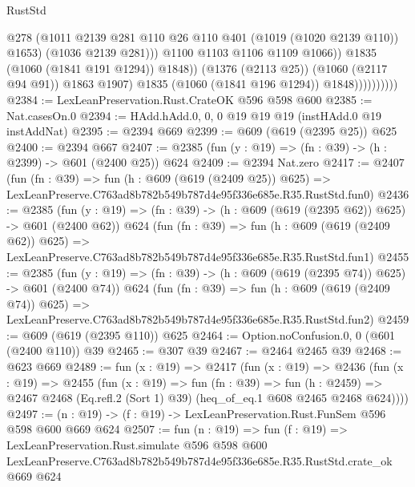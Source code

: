 \begin{lexlean}{RustStd}
\begin{coremodule}
                                      @278
                                      (@1011
                                        @2139
                                        @281
                                        @110
                                        @26
                                        @110
                                        @401
                                        (@1019 (@1020 @2139 @110))
                                        @1653)
                                      (@1036 @2139 @281)))
                                  @1100
                                  @1103
                                  @1106
                                  @1109
                                  @1066))
                              @1835
                              (@1060 (@1841 @191 @1294))
                              @1848))
                          (@1376 (@2113 @25))
                          (@1060 (@2117 @94 @91))
                          @1863
                          @1907)
                        @1835
                        (@1060 (@1841 @196 @1294))
                        @1848))))))))))
@2384 := LexLeanPreservation.Rust.CrateOK @596 @598 @600
@2385 := Nat.casesOn.{0}
@2394 := HAdd.hAdd.{0, 0, 0} @19 @19 @19 (instHAdd.{0} @19 instAddNat)
@2395 := @2394 @669
@2399 := @609 (@619 (@2395 @25)) @625
@2400 := @2394 @667
@2407 := @2385 (fun (y : @19) => (fn : @39) -> (h : @2399) -> @601 (@2400 @25)) @624
@2409 := @2394 Nat.zero
@2417 := @2407
    (fun (fn : @39) =>
    fun (h : @609 (@619 (@2409 @25)) @625) =>
    LexLeanPreserve.C763ad8b782b549b787d4e95f336e685e.R35.RustStd.fun0)
@2436 := @2385
    (fun (y : @19) => (fn : @39) -> (h : @609 (@619 (@2395 @62)) @625) -> @601 (@2400 @62))
    @624
    (fun (fn : @39) =>
    fun (h : @609 (@619 (@2409 @62)) @625) =>
    LexLeanPreserve.C763ad8b782b549b787d4e95f336e685e.R35.RustStd.fun1)
@2455 := @2385
    (fun (y : @19) => (fn : @39) -> (h : @609 (@619 (@2395 @74)) @625) -> @601 (@2400 @74))
    @624
    (fun (fn : @39) =>
    fun (h : @609 (@619 (@2409 @74)) @625) =>
    LexLeanPreserve.C763ad8b782b549b787d4e95f336e685e.R35.RustStd.fun2)
@2459 := @609 (@619 (@2395 @110)) @625
@2464 := Option.noConfusion.{0, 0} (@601 (@2400 @110)) @39
@2465 := @307 @39
@2467 := @2464 @2465 @39
@2468 := @623 @669
@2489 := fun (x : @19) =>
  @2417
    (fun (x : @19) =>
    @2436
      (fun (x : @19) =>
      @2455
        (fun (x : @19) =>
        fun (fn : @39) =>
        fun (h : @2459) =>
        @2467 @2468 (Eq.refl.{2} (Sort 1) @39) (heq_of_eq.{1} @608 @2465 @2468 @624))))
@2497 := (n : @19) -> (f : @19) -> LexLeanPreservation.Rust.FunSem @596 @598 @600 @669 @624
@2507 := fun (n : @19) =>
  fun (f : @19) =>
  LexLeanPreservation.Rust.simulate
    @596
    @598
    @600
    LexLeanPreserve.C763ad8b782b549b787d4e95f336e685e.R35.RustStd.crate_ok
    @669
    @624
\end{coremodule}
\end{lexlean}

